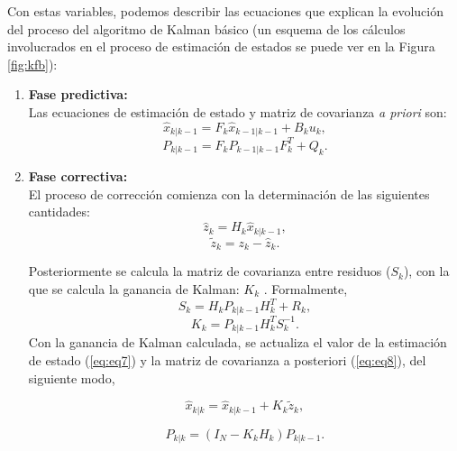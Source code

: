 Con estas variables, podemos describir las ecuaciones que explican la evoluci\'on del proceso del algoritmo de Kalman b\'asico (un esquema de los c\'alculos involucrados en el proceso de estimaci\'on de estados se puede ver en la Figura \ref{fig:kfb}):
\begin{enumerate}
\item \textbf{Fase predictiva:}\\
Las ecuaciones de estimaci\'on de estado y matriz de covarianza \textit{a priori} son:
\begin{equation}
\hat{x}_{k|k-1} = F_k \hat{x}_{k-1|k-1} + B_k u_k,
\label{eq:eq1}
\end{equation}
\begin{equation}
P_{k|k-1} = F_{k}P_{k-1|k-1}F_k^{T} + Q_k. 
\label{eq:eq2}
\end{equation}
\item \textbf{Fase correctiva:}\\
El proceso de correcci\'on comienza con la determinaci\'on de las siguientes cantidades:
\begin{equation}
\hat{z}_k = H_{k} \hat{x}_{k|k-1},
\label{eq:eq3}
\end{equation}
\begin{equation}
\tilde{z}_k=z_k - \hat{z}_k.
\label{eq:eq4}
\end{equation}

Posteriormente se calcula la matriz de covarianza entre residuos ($S_k$), con la que se calcula la ganancia de Kalman: $K_k$ . Formalmente,
\begin{equation}
S_k = H_k P_{k|k-1} H_{k}^T + R_k,
\label{eq:eq5}
\end{equation}
\begin{equation}
K_k = P_{k|k-1} H_k^T S_k^{-1}.
\label{eq:eq6}
\end{equation}
Con la ganancia de Kalman calculada, se actualiza el valor de la estimaci\'on de estado (\ref{eq:eq7}) y la matriz de covarianza a posteriori (\ref{eq:eq8}), del siguiente modo, 

\begin{equation}
\hat{x}_{k|k} = \hat{x}_{k|k-1} + K_k \tilde{z}_k,
\label{eq:eq7}
\end{equation}

\begin{equation}
P_{k|k} = (I_N - K_kH_k)P_{k|k-1}.
\label{eq:eq8}
\end{equation}
\bigskip

\end{enumerate}

